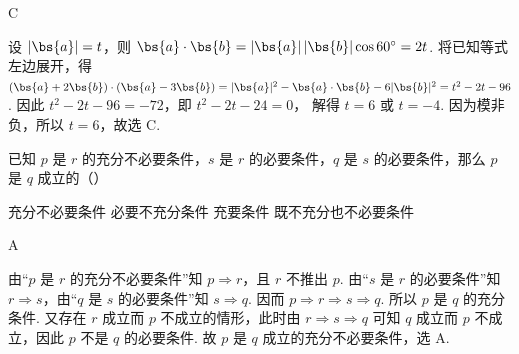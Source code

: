 \begin{answer}
C
\end{answer}

\begin{solution}
设 \(\left|\bs{a}\right|=t\)，则 \(\bs{a}\cdot\bs{b}=\left|\bs{a}\right|\left|\bs{b}\right|\cos60^\circ=2t\). 将已知等式左边展开，得 \((\bs{a}+2\bs{b})\cdot(\bs{a}-3\bs{b})=|\bs{a}|^2-\bs{a}\cdot\bs{b}-6|\bs{b}|^2=t^2-2t-96\). 因此 \(t^2-2t-96=-72\)，即 \(t^2-2t-24=0\)，
解得 \(t=6\) 或 \(t=-4\). 因为模非负，所以 \(t=6\)，故选 C.
\end{solution}

\begin{problem}
已知 \( p \) 是 \( r \) 的充分不必要条件，\( s \) 是 \( r \) 的必要条件，\( q \) 是 \( s \) 的必要条件，那么 \( p \) 是 \( q \) 成立的（\quad）

\choices
    {充分不必要条件}
    {必要不充分条件}
    {充要条件}
    {既不充分也不必要条件}
\end{problem}

\begin{answer}
A
\end{answer}

\begin{solution}
由“\(p\) 是 \(r\) 的充分不必要条件”知 \(p\Rightarrow r\)，且 \(r\) 不推出 \(p\). 由“\(s\) 是 \(r\) 的必要条件”知 \(r\Rightarrow s\)，由“\(q\) 是 \(s\) 的必要条件”知 \(s\Rightarrow q\). 因而
\(p\Rightarrow r\Rightarrow s\Rightarrow q\).
所以 \(p\) 是 \(q\) 的充分条件. 又存在 \(r\) 成立而 \(p\) 不成立的情形，此时由 \(r\Rightarrow s\Rightarrow q\) 可知 \(q\) 成立而 \(p\) 不成立，因此 \(p\) 不是 \(q\) 的必要条件. 故 \(p\) 是 \(q\) 成立的充分不必要条件，选 A.
\end{solution}

